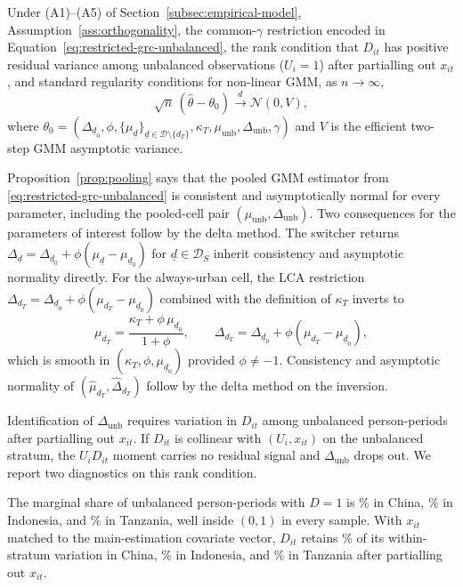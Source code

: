 \documentclass[12pt]{article}
\begin{document}
\begin{proposition}
\label{prop:pooling}
Under (A1)--(A5) of Section~\ref{subsec:empirical-model}, Assumption~\ref{ass:orthogonality}, the common-$\gamma$ restriction encoded in Equation~\eqref{eq:restricted-grc-unbalanced}, the rank condition that $D_{it}$ has positive residual variance among unbalanced observations ($U_i = 1$) after partialling out $x_{it}$, and standard regularity conditions for non-linear GMM, as $n \to \infty$,
\[
\sqrt n\,(\hat\theta - \theta_0) \xrightarrow{d} \mathcal N(0,V),
\]
where $\theta_0 = (\Delta_{\underline d_0},\phi,\{\mu_{\underline d}\}_{\underline d \in \mathcal D \setminus \{d_T\}},\kappa_T,\mu_{\mathrm{unb}},\Delta_{\mathrm{unb}},\gamma)$ and $V$ is the efficient two-step GMM asymptotic variance.
\end{proposition}

Proposition~\ref{prop:pooling} says that the pooled GMM estimator from \eqref{eq:restricted-grc-unbalanced} is consistent and asymptotically normal for every parameter, including the pooled-cell pair $(\mu_{\mathrm{unb}}, \Delta_{\mathrm{unb}})$.
Two consequences for the parameters of interest follow by the delta method.
The switcher returns $\Delta_{\underline d} = \Delta_{\underline d_0} + \phi(\mu_{\underline d}-\mu_{\underline d_0})$ for $\underline d \in \mathcal D_S$ inherit consistency and asymptotic normality directly.
For the always-urban cell, the LCA restriction $\Delta_{d_T} = \Delta_{\underline d_0} + \phi(\mu_{d_T}-\mu_{\underline d_0})$ combined with the definition of $\kappa_T$ inverts to
\[
\mu_{d_T} = \frac{\kappa_T + \phi\,\mu_{\underline d_0}}{1+\phi}, \qquad \Delta_{d_T} = \Delta_{\underline d_0} + \phi(\mu_{d_T}-\mu_{\underline d_0}),
\]
which is smooth in $(\kappa_T, \phi, \mu_{\underline d_0})$ provided $\phi \neq -1$.
Consistency and asymptotic normality of $(\hat\mu_{d_T}, \hat\Delta_{d_T})$ follow by the delta method on the inversion.

Identification of $\Delta_{\mathrm{unb}}$ requires variation in $D_{it}$ among unbalanced person-periods after partialling out $x_{it}$.
If $D_{it}$ is collinear with $(U_i, x_{it})$ on the unbalanced stratum, the $U_iD_{it}$ moment carries no residual signal and $\Delta_{\mathrm{unb}}$ drops out.
We report two diagnostics on this rank condition.

The marginal share of unbalanced person-periods with $D=1$ is \unbUrbanRateCHN\% in China, \unbUrbanRateIDN\% in Indonesia, and \unbUrbanRateTZA\% in Tanzania, well inside $(0,1)$ in every sample.
With $x_{it}$ matched to the main-estimation covariate vector, $D_{it}$ retains \unbResidShareCHN\% of its within-stratum variation in China, \unbResidShareIDN\% in Indonesia, and \unbResidShareTZA\% in Tanzania after partialling out $x_{it}$.
\end{document}
